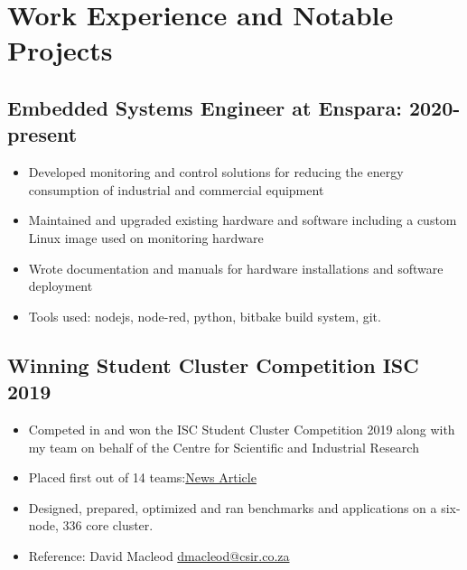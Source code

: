 \documentclass[10pt,a4paper,notitlepage]{article}
\begin{document}
\section*{Work Experience and Notable Projects}

\subsection*{Embedded Systems Engineer at Enspara: 2020-present}
\begin{itemize}
	\setlength\itemsep{0.02em}
    \item Developed monitoring and control solutions for reducing the energy consumption of industrial and commercial equipment
    \item Maintained and upgraded existing hardware and software including a custom Linux image used on monitoring hardware
    \item Wrote documentation and manuals for hardware installations and software deployment
    \item Tools used: nodejs, node-red, python, bitbake build system, git.
\end{itemize}

\subsection*{Winning Student Cluster Competition ISC 2019}
\begin{itemize}
	\setlength\itemsep{0.02em}
    \item Competed in and won the ISC Student Cluster Competition 2019 along with my team on behalf of the Centre for Scientific and Industrial Research
    \item Placed first out of 14 teams:\href{https://www.chpc.ac.za/index.php/news2/241-south-africa-wins-international-student-cluster-competition-for-the-fourth-time}{News Article}
    \item Designed, prepared, optimized and ran benchmarks and applications on a six-node, 336 core cluster.
    \item Reference: David Macleod \href{mailto:dmacleod@csir.co.za}{dmacleod@csir.co.za}
\end{itemize}
\end{document}
